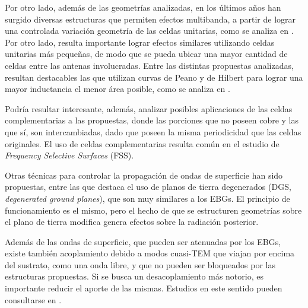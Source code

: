 Por otro lado, además de las geometrías analizadas, en los últimos años han surgido diversas estructuras que permiten efectos multibanda, a partir de lograr una controlada variación geometría de las celdas unitarias, como se analiza en \cite{Kern:multiband}. Por otro lado, resulta importante lograr efectos similares utilizando celdas unitarias más pequeñas, de modo que se pueda ubicar una mayor cantidad de celdas entre las antenas involucradas. Entre las distintas propuestas analizadas, resultan destacables las que utilizan curvas de Peano y de Hilbert para lograr una mayor inductancia el menor área posible, como se analiza en \cite{McVay:Peano}.

Podría resultar interesante, además, analizar posibles aplicaciones de las celdas complementarias a las propuestas, donde las porciones que no poseen cobre y las que sí, son intercambiadas, dado que poseen la misma periodicidad que las celdas originales. El uso de celdas complementarias resulta común en el estudio de \textit{Frequency Selective Surfaces} (FSS).

Otras técnicas para controlar la propagación de ondas de superficie han sido propuestas, entre las que destaca el uso de planos de tierra degenerados (DGS, \textit{degenerated ground planes}), que son muy similares a los EBGs. El principio de funcionamiento es el mismo, pero el hecho de que se estructuren geometrías sobre el plano de tierra modifica genera efectos sobre la radiación posterior.

Además de las ondas de superficie, que pueden ser atenuadas por los EBGs, existe también acoplamiento debido a modos cuasi-TEM que viajan por encima del sustrato, como una onda libre, y que no pueden ser bloqueados por las estructuras propuestas. Si se busca un desacoplamiento más notorio, es importante reducir el aporte de las mismas. Estudios en este sentido pueden consultarse en \cite{Asimonis:designoptimization}.



